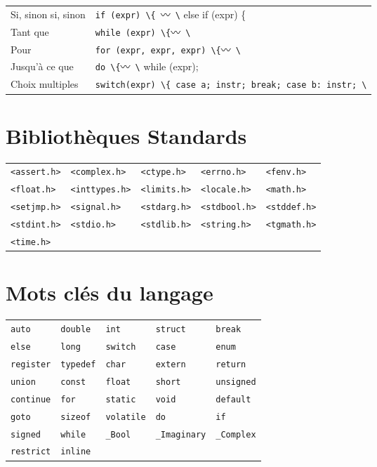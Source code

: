 \documentclass{article}
\newcommand{\any}{$\hzigzag$~}
\newcommand{\cd}{\lstinline}
\begin{document}
\begin{multicols*}{3}
  \begin{tabularx}{\linewidth}{Xl}
  Si, sinon si, sinon & \cd{if (expr) \{}~\any\cd{\} else if (expr) \{}~\any\cd{\} else \{}~\any\cd{\};} \\
  Tant que & \cd{while (expr) \{}\any\cd{\}} \\
  Pour & \cd{for (expr, expr, expr) \{}\any\cd{\}} \\
  Jusqu'à ce que & \cd{do \{}\any\cd{\} while (expr);} \\
  Choix multiples & \cd{switch(expr) \{ case a; instr; break; case b: instr; \}} \\
  \end{tabularx}

\section*{Bibliothèques Standards}
  \begin{tabularx}{\linewidth}{XXXXX}
    \cd{<assert.h>} & \cd{<complex.h>}  & \cd{<ctype.h>}  & \cd{<errno.h>}   & \cd{<fenv.h>} \\
    \cd{<float.h>}  & \cd{<inttypes.h>} & \cd{<limits.h>} & \cd{<locale.h>}  & \cd{<math.h>} \\
    \cd{<setjmp.h>} & \cd{<signal.h>}   & \cd{<stdarg.h>} & \cd{<stdbool.h>} & \cd{<stddef.h>} \\
    \cd{<stdint.h>} & \cd{<stdio.h>}    & \cd{<stdlib.h>} & \cd{<string.h>}  & \cd{<tgmath.h>} \\
    \cd{<time.h>}   &              &            &             & \\
  \end{tabularx}

\section*{Mots clés du langage}
  \begin{tabularx}{\linewidth}{XXXXX}
    \cd{auto} & \cd{double}  & \cd{int}  & \cd{struct}   & \cd{break} \\
    \cd{else}  & \cd{long} & \cd{switch} & \cd{case}  & \cd{enum} \\
    \cd{register} & \cd{typedef}   & \cd{char} & \cd{extern} & \cd{return} \\
    \cd{union} & \cd{const}    & \cd{float} & \cd{short}  & \cd{unsigned} \\
    \cd{continue}   & \cd{for} & \cd{static} & \cd{void} & \cd{default} \\
    \cd{goto} & \cd{sizeof} & \cd{volatile} & \cd{do} & \cd{if} \\
    \cd{signed} & \cd{while} & \cd{_Bool} & \cd{_Imaginary} & \cd{_Complex} \\
    \cd{restrict} & \cd{inline} &  &  &  \\
  \end{tabularx}

\end{multicols*}
\end{document}
